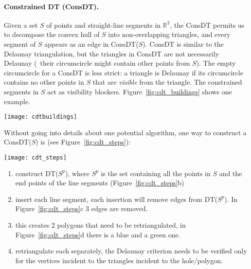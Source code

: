 \paragraph*{Constrained DT (ConsDT).}
Given a set $S$ of points and straight-line segments in $\mathbb{R}^2$, the ConsDT permits us to decompose the convex hull of $S$ into non-overlapping triangles, and every segment of $S$ appears as an edge in ConsDT($S$). 
ConsDT is similar to the Delaunay triangulation, but the triangles in ConsDT are not necessarily Delaunay (\ie\ their circumcircle might contain other points from $S$). 
The empty circumcircle for a ConsDT is less strict: a triangle is Delaunay if its circumcircle contains no other points in $S$ that are \emph{visible} from the triangle.
The constrained segments in $S$ act as visibility blockers. 
Figure~\ref{fig:cdt_buildings} shows one example.
\begin{figure*}
  \centering
  \texttt{[image: cdtbuildings]}
  \caption{The ConsDT of a set of segments. On the right, the triangle whose circumcircle is green is a Delaunay (no other points in its interior) and so is the triangle whose circumcircle is in purple (there is one point in its interior, but it cannot be seen because of the constrained segment).}%
\label{fig:cdt_buildings}
\end{figure*}

%

Without going into details about one potential algorithm, one way to construct a ConsDT($S$) is (see Figure~\ref{fig:cdt_steps}):
\begin{figure*}
  \centering
  \texttt{[image: cdt\_steps]}
  \caption{Steps to construct a ConsDT.}%
\label{fig:cdt_steps}
\end{figure*}
\begin{enumerate}
  \item construct DT($S^p$), where $S^p$ is the set containing all the points in $S$ and the end points of the line segments (Figure~\ref{fig:cdt_steps}b)
  \item insert each line segment, each insertion will remove edges from DT($S^p$). In Figure~\ref{fig:cdt_steps}c 3 edges are removed.
  \item this creates 2 polygons that need to be retriangulated, in Figure~\ref{fig:cdt_steps}d there is a blue and a green one.
  \item retriangulate each separately, the Delaunay criterion needs to be verified only for the vertices incident to the triangles incident to the hole/polygon.
\end{enumerate}


